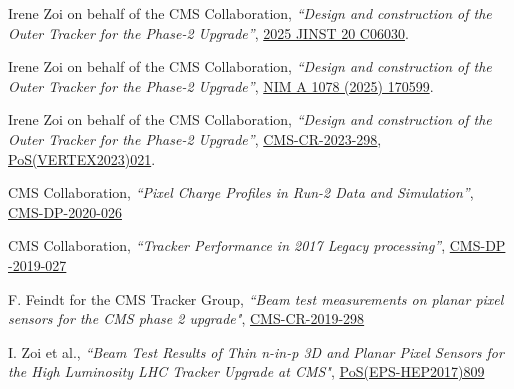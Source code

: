 \begin{refsection}
      \vspace{2mm}
      \onehalfspacing
Irene Zoi on behalf of the CMS Collaboration, {\sl ``Design and construction of the Outer Tracker for the Phase-2 Upgrade''},
\href{https://doi.org/10.1088/1748-0221/20/06/C06030}{2025 JINST 20 C06030}.
    \end{refsection}

\begin{refsection}
      \vspace{2mm}
      \onehalfspacing
Irene Zoi on behalf of the CMS Collaboration, {\sl ``Design and construction of the Outer Tracker for the Phase-2 Upgrade''},
\href{https://authors.elsevier.com/a/1l7wacPqbwV7W}{NIM A 1078 (2025) 170599}.
    \end{refsection}


\begin{refsection}
      \vspace{2mm}
      \onehalfspacing
Irene Zoi on behalf of the CMS Collaboration, {\sl ``Design and construction of the Outer Tracker for the Phase-2 Upgrade''},
\href{https://cds.cern.ch/record/2885850?ln=en}{CMS-CR-2023-298},
\href{https://doi.org/10.22323/1.448.0021}{PoS(VERTEX2023)021}.
    \end{refsection}

  
    \begin{refsection}
      \vspace{2mm}
      \onehalfspacing
CMS Collaboration, {\sl ``Pixel Charge Profiles in Run-2 Data and Simulation''},
\href{https://cds.cern.ch/record/2720551/files/DP2020_026.pdf}{CMS-DP-2020-026}
    \end{refsection}

      \begin{refsection}
      \vspace{2mm}
      \onehalfspacing
CMS Collaboration, {\sl ``Tracker Performance in 2017 Legacy processing''},
\href{http://cds.cern.ch/record/2689892/files/DP2019_027.pdf}{CMS-DP -2019-027}
    \end{refsection}


    \begin{refsection}
      \vspace{2mm}
      \onehalfspacing
       F. Feindt for the CMS Tracker Group, {\sl ``Beam test measurements on planar pixel sensors for the CMS phase 2 upgrade"}, \href{http://cds.cern.ch/record/2713732}{CMS-CR-2019-298}
    \end{refsection}
  


     
        \begin{refsection}
      \vspace{2mm}
      \onehalfspacing
      I. Zoi et al., {\sl ``Beam Test Results of Thin n-in-p 3D and Planar Pixel Sensors for the High Luminosity LHC Tracker Upgrade at CMS"}, \href{https://doi.org/10.22323/1.314.0809}{PoS(EPS-HEP2017)809}
    \end{refsection}


 
